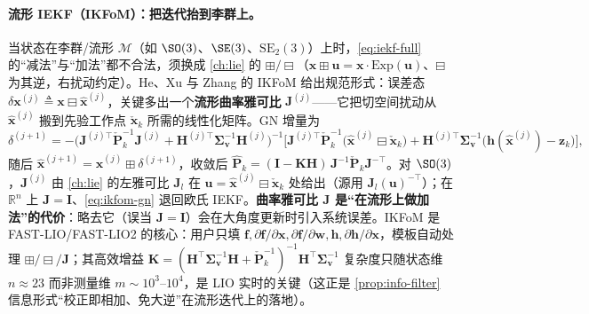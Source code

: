 \paragraph{流形 IEKF（IKFoM）：把迭代抬到李群上。}
当状态在李群/流形 $\mathcal{M}$（如 $\SO(3)$、$\SE(3)$、$\mathrm{SE}_2(3)$）上时，\cref{eq:iekf-full} 的“减法”与“加法”都不合法，须换成 \cref{ch:lie} 的 $\boxplus/\boxminus$（$\mathbf{x}\boxplus\mathbf{u}=\mathbf{x}\cdot\mathrm{Exp}(\mathbf{u})$、$\boxminus$ 为其逆，右扰动约定）。He、Xu 与 Zhang 的 IKFoM\cite{he2021ikfom} 给出规范形式：误差态 $\delta\mathbf{x}^{(j)}\triangleq\mathbf{x}\boxminus\hat{\mathbf{x}}^{(j)}$，关键多出一个\textbf{流形曲率雅可比} $\mathbf{J}^{(j)}$——它把切空间扰动从 $\hat{\mathbf{x}}^{(j)}$ 搬到先验工作点 $\check{\mathbf{x}}_k$ 所需的线性化矩阵。GN 增量为
\begin{equation}
  \delta^{(j+1)}=-\big(\mathbf{J}^{(j)\top}\check{\mathbf{P}}_k^{-1}\mathbf{J}^{(j)}+\mathbf{H}^{(j)\top}\boldsymbol{\Sigma}_{\mathbf{v}}^{-1}\mathbf{H}^{(j)}\big)^{-1}\Big[\mathbf{J}^{(j)\top}\check{\mathbf{P}}_k^{-1}\big(\hat{\mathbf{x}}^{(j)}\boxminus\check{\mathbf{x}}_k\big)+\mathbf{H}^{(j)\top}\boldsymbol{\Sigma}_{\mathbf{v}}^{-1}\big(\mathbf{h}(\hat{\mathbf{x}}^{(j)})-\mathbf{z}_k\big)\Big],
  \label{eq:ikfom-gn}
\end{equation}
随后 $\hat{\mathbf{x}}^{(j+1)}=\hat{\mathbf{x}}^{(j)}\boxplus\delta^{(j+1)}$，收敛后 $\hat{\mathbf{P}}_k=(\mathbf{I}-\mathbf{K}\mathbf{H})\,\mathbf{J}^{-1}\check{\mathbf{P}}_k\mathbf{J}^{-\top}$。对 $\SO(3)$，$\mathbf{J}^{(j)}$ 由 \cref{ch:lie} 的左雅可比 $\mathbf{J}_l$ 在 $\mathbf{u}=\hat{\mathbf{x}}^{(j)}\boxminus\check{\mathbf{x}}_k$ 处给出（源用 $\mathbf{J}_l(\mathbf{u})^{-\top}$）；在 $\mathbb{R}^n$ 上 $\mathbf{J}=\mathbf{I}$、\cref{eq:ikfom-gn} 退回欧氏 IEKF。\textbf{曲率雅可比 $\mathbf{J}$ 是“在流形上做加法”的代价}：略去它（误当 $\mathbf{J}=\mathbf{I}$）会在大角度更新时引入系统误差。IKFoM 是 FAST-LIO/FAST-LIO2 的核心\cite{xu2021fastlio,xu2022fastlio2}：用户只填 $\mathbf{f},\partial\mathbf{f}/\partial\mathbf{x},\partial\mathbf{f}/\partial\mathbf{w},\mathbf{h},\partial\mathbf{h}/\partial\mathbf{x}$，模板自动处理 $\boxplus/\boxminus/\mathbf{J}$；其高效增益 $\mathbf{K}=(\mathbf{H}^\top\boldsymbol{\Sigma}_{\mathbf{v}}^{-1}\mathbf{H}+\check{\mathbf{P}}_k^{-1})^{-1}\mathbf{H}^\top\boldsymbol{\Sigma}_{\mathbf{v}}^{-1}$ 复杂度只随状态维 $n\approx23$ 而非测量维 $m\sim10^3\text{--}10^4$，是 LIO 实时的关键（这正是 \cref{prop:info-filter} 信息形式“校正即相加、免大逆”在流形迭代上的落地）。

